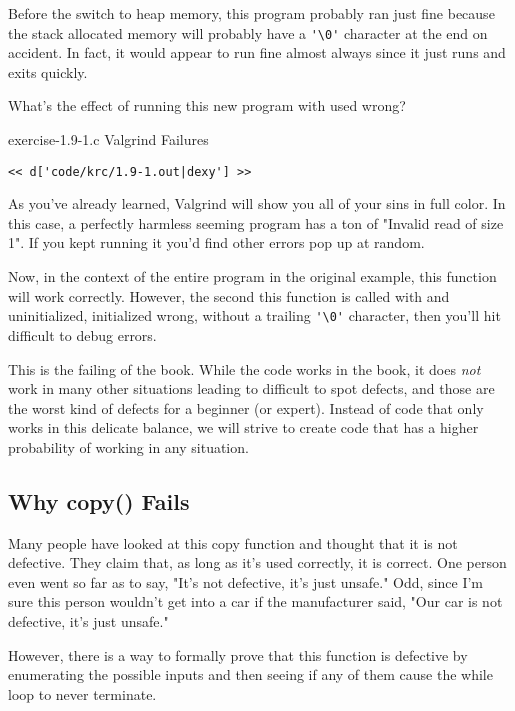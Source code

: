 Before the switch to heap memory, this program probably ran just fine
because the stack allocated memory will probably have a \verb|'\0'| character
at the end on accident.  In fact, it would appear to run fine almost always
since it just runs and exits quickly.

What's the effect of running this new program with  used wrong?

\begin{code}{exercise-1.9-1.c Valgrind Failures}
\begin{lstlisting}
<< d['code/krc/1.9-1.out|dexy'] >>
\end{lstlisting}
\end{code}

As you've already learned, Valgrind will show you all of your sins in full
color.  In this case, a perfectly harmless seeming program has a ton of
"Invalid read of size 1".  If you kept running it you'd find other errors pop
up at random.

Now, in the context of the entire program in the original \krc example, this function
will work correctly.  However, the second this function is called with
 and  uninitialized, initialized wrong, 
without a trailing \verb|'\0'| character, then you'll hit difficult to debug
errors.

This is the failing of the book.  While the code works in the book, it does
\emph{not} work in many other situations leading to difficult to spot defects,
and those are the worst kind of defects for a beginner (or expert).
Instead of code that only works in this delicate balance, we will strive to
create code that has a higher probability of working in any situation.

\subsection{Why copy() Fails}

Many people have looked at this copy function and thought that it is not
defective.  They claim that, as long as it's used correctly, it is correct.
One person even went so far as to say, "It's not defective, it's just unsafe."
Odd, since I'm sure this person wouldn't get into a car if the manufacturer
said, "Our car is not defective, it's just unsafe."

However, there is a way to formally prove that this function is defective by
enumerating the possible inputs and then seeing if any of them cause the
while loop to never terminate. 

